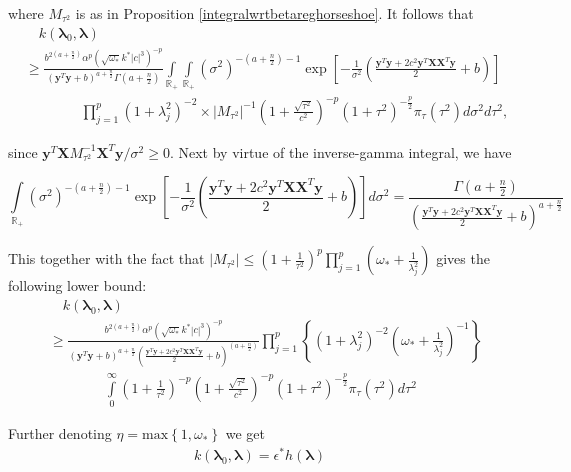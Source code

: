 \documentclass[noinfoline,11pt]{imsart}
\numberwithin{equation}{section}
\theoremstyle{plain}
\newcommand{\y}{\mathbf{y}}
\newcommand{\X}{\mathbf{X}}
\newcommand{\bl}{\boldsymbol{\lambda}}
\begin{document}
\noindent
where $M_{\tau^2}$ is as in Proposition \ref{integralwrtbetareghorseshoe}. It follows that 
\begin{align*}
& \quad k\left(\bl_0,\bl\right)\\
& \geq \frac{b^{2\left(a+\frac{n}{2}\right)}\alpha^p\left(\sqrt{\omega_*}k^*|c|^3\right)^{-p}}{\left(\y^T\y+b\right)^{a+\frac{n}{2}}\Gamma\left(a+\frac{n}{2}\right)}\int\limits_{\mathbb{R}_+}\int\limits_{\mathbb{R}_+}\left(\sigma^2\right)^{-\left(a+\frac{n}{2}\right)-1}\exp{\left[-\frac{1}{\sigma^2}\left(\frac{\y^T\y+2c^2\y^T\X\X^T\y}{2}+b\right)\right]}\nonumber \\
&\qquad \qquad \prod\limits_{j=1}^p\left(1+\lambda_j^2\right)^{-2}\times \left|M_{\tau^2}\right|^{-1}\left(1+\frac{\sqrt{\tau^2}}{c^2}\right)^{-p}\left(1+\tau^2\right)^{-\frac{p}{2}}\pi_\tau\left(\tau^2\right)d\sigma^2d\tau^2, 
\end{align*}

\noindent
since $\y^T\X M_{\tau^2}^{-1}\X^T\y/\sigma^2\geq 0.$ Next by virtue of the 
inverse-gamma integral, we have 

$$\int\limits_{\mathbb{R}_+}\left(\sigma^2\right)^{-\left(a+\frac{n}{2}\right)-1}\exp{\left[-\frac{1}{\sigma^2}\left(\frac{\y^T\y+2c^2\y^T\X\X^T\y}{2}+b\right)\right]}d\sigma^2=\frac{\Gamma\left(a+\frac{n}{2}\right)}{\left(\frac{\y^T\y+2c^2\y^T\X\X^T\y}{2}+b\right)^{a+\frac{n}{2}}}$$

\noindent
This together with the fact that $\mid M_{\tau^2}\mid\leq \left(1+\frac{1}{\tau^2}\right)^p \prod\limits_{j=1}^p\left(\omega_*+\frac{1}{\lambda_j^2}\right)$ gives the following lower bound:
\begin{align*} 
& \quad k\left(\bl_0,\bl\right)\nonumber \\
& \geq \frac{b^{2\left(a+\frac{n}{2}\right)}\alpha^p\left(\sqrt{\omega_*}k^*|c|^3\right)^{-p}}{\left(\y^T\y+b\right)^{a+\frac{n}{2}}\left(\frac{\y^T\y+2c^2\y^T\X\X^T\y}{2}+b\right)^{\left(a+\frac{n}{2}\right)}}\prod\limits_{j=1}^p\left\{\left(1+\lambda_j^2\right)^{-2}\left(\omega_*+\frac{1}{\lambda_j^2}\right)^{-1}\right\}\nonumber \\
& \qquad \qquad \int\limits_{0}^{\infty}\left(1+\frac{1}{\tau^2}\right)^{-p} \left(1+\frac{\sqrt{\tau^2}}{c^2}\right)^{-p}\left(1+\tau^2\right)^{-\frac{p}{2}}\pi_\tau\left(\tau^2\right)d\tau^2 
\end{align*}

\noindent
Further denoting $\eta=\text{max}\left\{1,\omega_*\right\}$ we get
\begin{align*} 
 k\left(\bl_0,\bl\right) = \epsilon^* h\left(\bl\right)
\end{align*}
\end{document}
